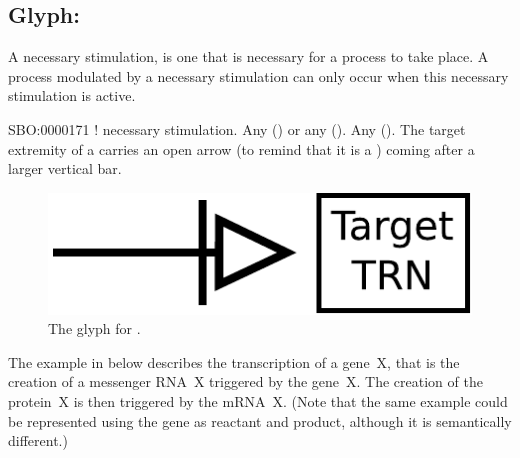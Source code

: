 

\subsection{Glyph: }\label{sec:necessary_stim}

A necessary stimulation, is one that is necessary for a process to take place. A process modulated by a necessary stimulation can only occur when this necessary stimulation is active.

\begin{glyphDescription}
 \glyphSboTerm SBO:0000171 ! necessary stimulation.
 \glyphOrigin Any  () or any  ().
 \glyphTarget Any  ().
 \glyphNode The target extremity of a  carries an open arrow (to remind that it is a ) coming after a larger vertical bar.
 \end{glyphDescription}

\begin{figure}[H]
  \centering
  \includegraphics[scale = 0.5]{images/necessary_stim}
  \caption{The \PD glyph for .}
  \label{fig:Necessary Stimulation}
\end{figure}

The example in  below describes the transcription of a gene~X, that is the creation of a messenger RNA~X triggered by the gene~X.  The creation of the protein~X is then triggered by the mRNA~X.  (Note that the same example could be represented using the gene as reactant and product, although it is semantically different.)

